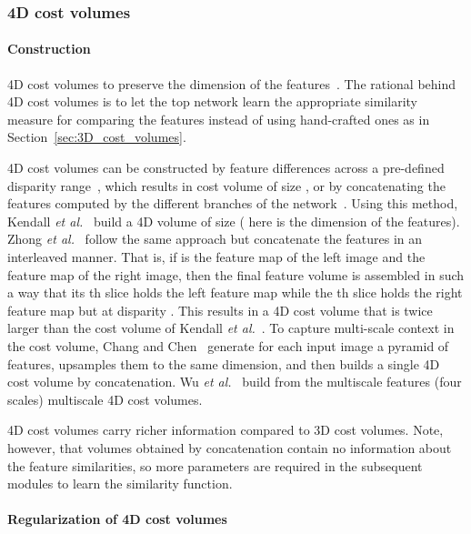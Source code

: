 \documentclass[10pt,journal,compsoc]{IEEEtran}
\newcommand{\etal}{\emph{et al.}}
\begin{document}
\subsubsection{4D cost volumes}
\label{sec:4D-cost_volumes}

\paragraph{Construction}
4D cost volumes to preserve the dimension of the features~\cite{zhong2017self,kendall2017end,chang2018pyramid,nie2019multi,Yang_2019_CVPR,Wu_2019_ICCV}. The rational behind 4D cost volumes is to let the top network learn the appropriate similarity measure for comparing the features instead of using hand-crafted ones  as in Section~\ref{sec:3D_cost_volumes}. 

4D cost volumes can be constructed  by feature  differences across a pre-defined disparity range~\cite{Yang_2019_CVPR}, which results in cost volume of size  , or by concatenating the features  computed by the different branches of the network~\cite{kendall2017end,zhong2017self,chang2018pyramid,nie2019multi,Wu_2019_ICCV}. Using this method, Kendall \etal~\cite{kendall2017end}  build  a 4D volume of size  ( here is the dimension of the features).    Zhong \etal~\cite{zhong2017self} follow the same approach but  concatenate the features in an interleaved manner. That is, if  is the feature map of the left image and  the feature map of the right image, then  the final feature volume is assembled in such a way that its th slice holds the left feature map while the th slice holds the right feature map but at disparity .  This results in a 4D cost volume that is twice larger than the cost volume of Kendall \etal~\cite{kendall2017end}.  To capture multi-scale context in the cost volume, Chang and Chen~\cite{chang2018pyramid} generate for each input image  a pyramid of features, upsamples them to the same dimension, and then builds a single 4D cost volume by concatenation.  Wu \etal~\cite{Wu_2019_ICCV} build from the multiscale features (four scales) multiscale 4D cost volumes.


4D cost volumes carry richer information compared to 3D cost volumes. Note, however, that volumes obtained by concatenation  contain no information about the feature similarities, so more parameters are required in the subsequent modules to learn the similarity  function.






\paragraph{Regularization of 4D cost volumes}
\end{document}
